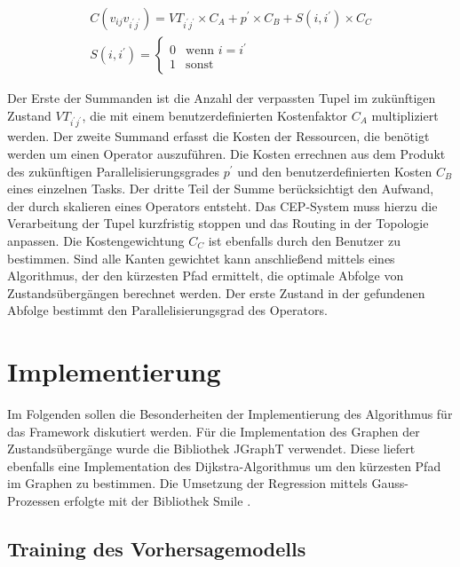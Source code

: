 \begin{equation*}
\begin{split}
C(v_{ij}v_{i^\prime j^\prime}) = VT_{i^\prime j^\prime} \times  C_A + p^\prime \times C_B + S(i,i^\prime) \times C_C \\
   S(i,i^\prime) =
   \begin{cases}
     0 & \text{wenn } i = i^\prime \\
     1 & \text{sonst} 
   \end{cases}
\end{split}
\end{equation*}


Der Erste der Summanden ist die Anzahl der verpassten Tupel im zukünftigen Zustand \(VT_{i^\prime j^\prime}\), die mit einem benutzerdefinierten Kostenfaktor \(C_A\) multipliziert werden.
Der zweite Summand erfasst die Kosten der Ressourcen, die benötigt werden um einen Operator auszuführen.
Die Kosten errechnen aus dem Produkt des zukünftigen Parallelisierungsgrades \(p^\prime\) und den benutzerdefinierten Kosten \(C_B\) eines einzelnen Tasks.
Der dritte Teil der Summe berücksichtigt den Aufwand, der durch skalieren eines Operators entsteht.
Das CEP-System muss hierzu die Verarbeitung der Tupel kurzfristig stoppen und das Routing in der Topologie anpassen.
Die Kostengewichtung \(C_C\) ist ebenfalls durch den Benutzer zu bestimmen.
Sind alle Kanten gewichtet kann anschließend mittels eines Algorithmus, der den kürzesten Pfad ermittelt, die optimale Abfolge von Zustandsübergängen berechnet werden.
Der erste Zustand in der gefundenen Abfolge bestimmt den Parallelisierungsgrad des Operators.

\section{Implementierung}

Im Folgenden sollen die Besonderheiten der Implementierung des Algorithmus für das Framework diskutiert werden.
Für die Implementation des Graphen der Zustandsübergänge wurde die Bibliothek JGraphT \cite{noauthor_welcome_nodate} verwendet.
Diese liefert ebenfalls eine Implementation des Dijkstra-Algorithmus um den kürzesten Pfad im Graphen zu bestimmen.
Die Umsetzung der Regression mittels Gauss-Prozessen erfolgte mit der Bibliothek Smile \cite{noauthor_smile_nodate}.

\subsection{Training des Vorhersagemodells}

